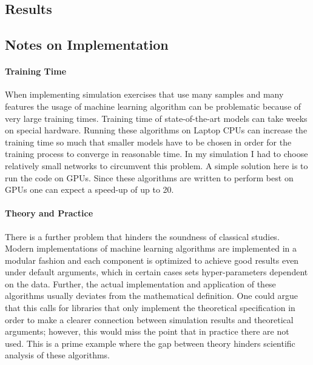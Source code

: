 \subsection{Results}


\subsection{Notes on Implementation}

\paragraph{Training Time}

When implementing simulation exercises that use many samples and many features the usage
of machine learning algorithm can be problematic because of very large training times.
Training time of state-of-the-art models can take weeks on special hardware. Running
these algorithms on Laptop CPUs can increase the training time so much that smaller
models have to be chosen in order for the training process to converge in reasonable
time. In my simulation I had to choose relatively small networks to circumvent this
problem. A simple solution here is to run the code on GPUs. Since these algorithms are
written to perform best on GPUs one can expect a speed-up of up to 20.

\paragraph{Theory and Practice}

There is a further problem that hinders the soundness of classical studies. Modern
implementations of machine learning algorithms are implemented in a modular fashion and
each component is optimized to achieve good results even under default arguments, which
in certain cases sets hyper-parameters dependent on the data. Further, the actual
implementation and application of these algorithms usually deviates from the
mathematical definition. One could argue that this calls for libraries that only
implement the theoretical specification in order to make a clearer connection between
simulation results and theoretical arguments; however, this would miss the point that in
practice there are not used. This is a prime example where the gap between theory
hinders scientific analysis of these algorithms.


